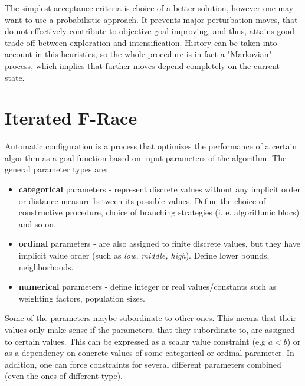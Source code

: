 \documentclass[12pt,a4paper,oneside]{book}
\begin{document}
The simplest acceptance criteria is choice of a better solution, however one may want to use a probabilistic approach. It prevents   major perturbation moves, that do not effectively contribute to objective goal improving, and thus, attains good trade-off between exploration and intensification. History can be taken into account in this heuristics, so the whole procedure is in fact a "Markovian" process, which implies that further moves depend completely on the current state.

\section{Iterated F-Race}

Automatic configuration is a process that optimizes the performance of a certain algorithm as a goal function based on input parameters of the algorithm. The general parameter types are:
 
\begin{itemize}
\item \textbf{categorical} parameters - represent discrete values without any implicit order or distance measure between its possible values. Define the choice of constructive procedure, choice of branching strategies (i. e. algorithmic blocs) and so on.
\item \textbf{ordinal} parameters - are also assigned to finite discrete values, but they have implicit value order (such as \emph{low, middle, high}). Define lower bounds, neighborhoods.
\item \textbf{numerical} parameters - define integer or real values/constants such as weighting factors, population sizes.
\end{itemize}

Some of the parameters maybe subordinate to other ones. This means that their values only make sense if the parameters, that they subordinate to, are assigned to certain values. This can be expressed as a scalar value constraint (e.g $a < b$) or as a dependency on concrete values of some categorical or ordinal parameter. In addition, one can force constraints for several different parameters combined (even the ones of different type).
\end{document}
